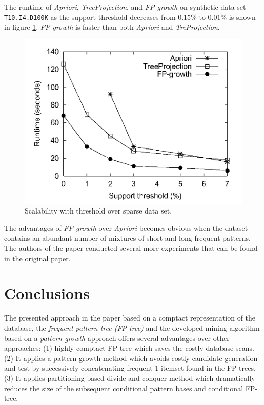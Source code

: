 \documentclass[12pt, a4paper]{article}
\newcommand{\code}[1]{\texttt{#1}}
\begin{document}
\newpage

The runtime of \textit{Apriori}, \textit{TreeProjection}, and \textit{FP-growth} on synthetic data set \code{T10.I4.D100K} as the support threshold decreases from $0.15\%$ to $0.01\%$ is shown in figure \ref{fig:runtime}. \textit{FP-growth} is faster than both \textit{Apriori} and \textit{TreProjection}.

\begin{figure}[H]
  \includegraphics[scale=0.5]{fp-tree-runtime}
  \centering
  \caption{Scalability with threshold over sparse data set.}
  \label{fig:runtime}
\end{figure}

The advantages of \textit{FP-growth} over \textit{Apriori} becomes obvious when the dataset contains an abundant number of mixtures of short and long frequent patterns. The authors of the paper conducted several more experiments that can be found in the original paper.

\section{Conclusions}

The presented approach in the paper based on a comptact representation of the database, the \textit{frequent pattern tree (FP-tree)} and the developed mining algorithm based on a \textit{pattern growth} approach offers several advantages over other approaches: (1) highly comptact FP-tree which saves the costly database scans. (2) It applies a pattern growth method which avoids costly candidate generation and test by successively concatenating frequent 1-itemset found in the FP-trees. (3) It applies partitioning-based divide-and-conquer method which dramatically reduces the size of the subsequent conditional  pattern bases and conditional FP-tree.
\end{document}
